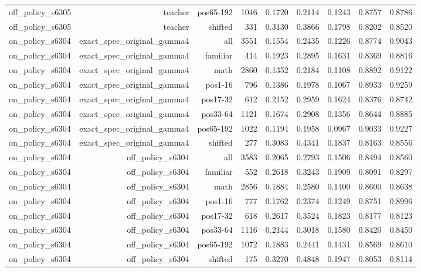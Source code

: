 \begin{tabular}{lrrrrrrrr}
off\_policy\_s6305 & teacher & pos65-192 & 1046 & 0.1720 & 0.2114 & 0.1243 & 0.8757 & 0.8786 \\
off\_policy\_s6305 & teacher & shifted & 331 & 0.3130 & 0.3866 & 0.1798 & 0.8202 & 0.8520 \\
on\_policy\_s6304 & exact\_spec\_original\_gamma4 & all & 3551 & 0.1554 & 0.2435 & 0.1226 & 0.8774 & 0.9043 \\
on\_policy\_s6304 & exact\_spec\_original\_gamma4 & familiar & 414 & 0.1923 & 0.2895 & 0.1631 & 0.8369 & 0.8816 \\
on\_policy\_s6304 & exact\_spec\_original\_gamma4 & math & 2860 & 0.1352 & 0.2184 & 0.1108 & 0.8892 & 0.9122 \\
on\_policy\_s6304 & exact\_spec\_original\_gamma4 & pos1-16 & 796 & 0.1386 & 0.1978 & 0.1067 & 0.8933 & 0.9259 \\
on\_policy\_s6304 & exact\_spec\_original\_gamma4 & pos17-32 & 612 & 0.2152 & 0.2959 & 0.1624 & 0.8376 & 0.8742 \\
on\_policy\_s6304 & exact\_spec\_original\_gamma4 & pos33-64 & 1121 & 0.1674 & 0.2908 & 0.1356 & 0.8644 & 0.8885 \\
on\_policy\_s6304 & exact\_spec\_original\_gamma4 & pos65-192 & 1022 & 0.1194 & 0.1958 & 0.0967 & 0.9033 & 0.9227 \\
on\_policy\_s6304 & exact\_spec\_original\_gamma4 & shifted & 277 & 0.3083 & 0.4341 & 0.1837 & 0.8163 & 0.8556 \\
on\_policy\_s6304 & off\_policy\_s6304 & all & 3583 & 0.2065 & 0.2793 & 0.1506 & 0.8494 & 0.8560 \\
on\_policy\_s6304 & off\_policy\_s6304 & familiar & 552 & 0.2618 & 0.3243 & 0.1909 & 0.8091 & 0.8297 \\
on\_policy\_s6304 & off\_policy\_s6304 & math & 2856 & 0.1884 & 0.2580 & 0.1400 & 0.8600 & 0.8638 \\
on\_policy\_s6304 & off\_policy\_s6304 & pos1-16 & 777 & 0.1762 & 0.2374 & 0.1249 & 0.8751 & 0.8996 \\
on\_policy\_s6304 & off\_policy\_s6304 & pos17-32 & 618 & 0.2617 & 0.3524 & 0.1823 & 0.8177 & 0.8123 \\
on\_policy\_s6304 & off\_policy\_s6304 & pos33-64 & 1116 & 0.2144 & 0.3018 & 0.1580 & 0.8420 & 0.8450 \\
on\_policy\_s6304 & off\_policy\_s6304 & pos65-192 & 1072 & 0.1883 & 0.2441 & 0.1431 & 0.8569 & 0.8610 \\
on\_policy\_s6304 & off\_policy\_s6304 & shifted & 175 & 0.3270 & 0.4848 & 0.1947 & 0.8053 & 0.8114 \\

\end{tabular}
